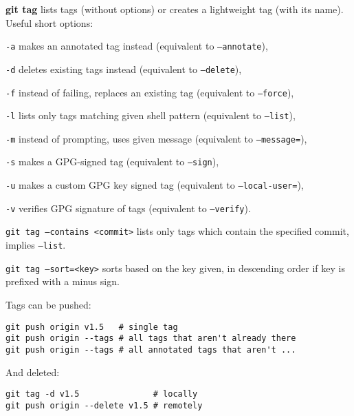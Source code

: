 %

\textbf{git tag} lists tags (without options) or creates a lightweight tag (with its name).
Useful short options:
\begin{compactenum}
\item [\texttt{-a}] makes an annotated tag instead (equivalent to \texttt{--annotate}),
\item [\texttt{-d}] deletes existing tags instead (equivalent to \texttt{--delete}),
\item [\texttt{-f}] instead of failing, replaces an existing tag (equivalent to \texttt{--force}),
\item [\texttt{-l}] lists only tags matching given shell pattern (equivalent to \texttt{--list}),
\item [\texttt{-m}] instead of prompting, uses given message (equivalent to \texttt{--message=}),
\item [\texttt{-s}] makes a GPG-signed tag (equivalent to \texttt{--sign}),
\item [\texttt{-u}] makes a custom GPG key signed tag (equivalent to \texttt{--local-user=}),
\item [\texttt{-v}] verifies GPG signature of tags (equivalent to \texttt{--verify}).
\end{compactenum}

\texttt{git tag --contains <commit>} lists only tags which contain the specified commit, implies \texttt{--list}.

\texttt{git tag --sort=<key>} sorts based on the key given, in descending order if key is prefixed with a minus sign.

Tags can be pushed:

\begin{verbatim}
git push origin v1.5   # single tag
git push origin --tags # all tags that aren't already there
git push origin --tags # all annotated tags that aren't ...
\end{verbatim}

And deleted:

\begin{verbatim}
git tag -d v1.5               # locally
git push origin --delete v1.5 # remotely
\end{verbatim}

%